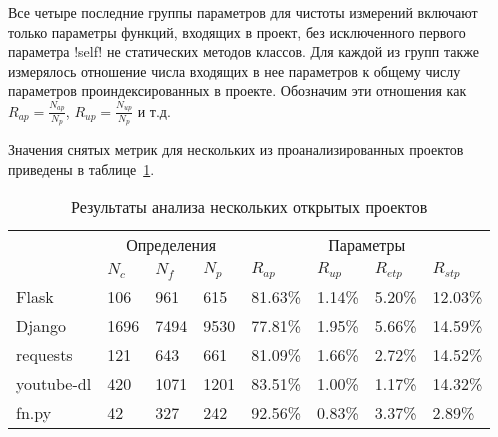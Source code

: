 Все четыре последние группы параметров для чистоты измерений включают только
параметры функций, входящих в проект, без исключенного первого параметра !self!
не статических методов классов. Для каждой из групп также измерялось
отношение числа входящих в нее параметров к общему числу параметров
проиндексированных в проекте.
Обозначим эти отношения как $R_{ap} = \frac{N_{ap}}{N_p}$, $R_{up} =
\frac{N_{up}}{N_p}$ и т.д.

Значения снятых метрик для нескольких из проанализированных проектов приведены в
таблице~\ref{tab:statistic-results-1}.

\begin{table}[H]
  \small
  \caption{Результаты анализа нескольких открытых проектов}
  \label{tab:statistic-results-1}
  \begin{tabularx}{\textwidth}{ |X|X|X|X|X|X|X|X| }
    \hline
    \multicolumn{1}{|c|}{\multirow{2}{*}{}} &
    \multicolumn{3}{c|}{Определения} &
    \multicolumn{4}{c|}{Параметры}
    \\ \cline{2-8}
    & $N_c$ & $N_f$ & $N_p$ & $R_{ap}$ & $R_{up}$ & $R_{etp}$ & $R_{stp}$ 
    \\ \hline

    Flask & 106 & 961 & 615 & 81.63\% & 1.14\% & 5.20\% & 12.03\%
    \\ \hline

    Django & 1696 & 7494 & 9530 & 77.81\% & 1.95\% & 5.66\% & 14.59\%
    \\ \hline

    requests & 121 & 643 & 661 & 81.09\% & 1.66\% & 2.72\% & 14.52\%
    \\ \hline

    youtube-dl & 420 & 1071 & 1201 & 83.51\% & 1.00\% & 1.17\% & 14.32\%
    \\ \hline

    fn.py & 42 & 327 & 242 & 92.56\% & 0.83\% & 3.37\% & 2.89\%
    \\ \hline






  \end{tabularx}
\end{table}

